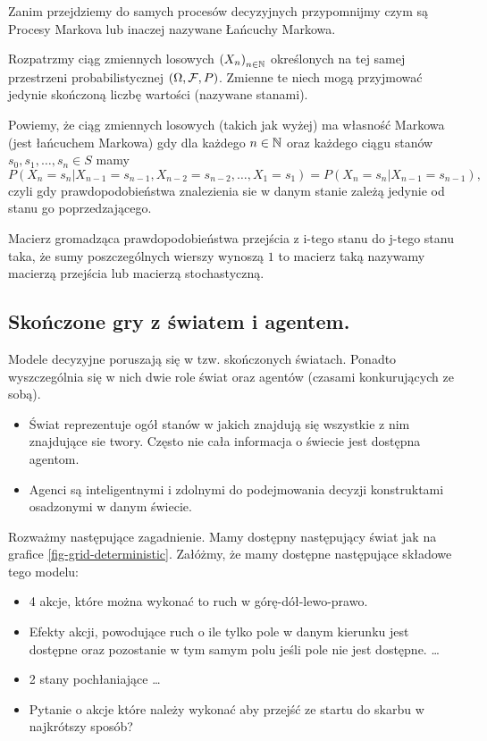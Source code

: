 \documentclass[10pt,a4paper]{book}
\begin{document}
Zanim przejdziemy do samych procesów decyzyjnych przypomnijmy czym są Procesy Markova lub inaczej nazywane Łańcuchy Markowa. 

Rozpatrzmy ciąg zmiennych losowych $\left( {X_n} \right)_{n\in \mathbb{N} }^{}$ określonych na tej samej przestrzeni probabilistycznej $(\Omega, \mathcal{F},P)$. Zmienne te niech mogą przyjmować jedynie skończoną liczbę wartości (nazywane stanami).

\begin{definition}
Powiemy, że ciąg zmiennych losowych (takich jak wyżej) ma własność Markowa (jest łańcuchem Markowa) gdy dla każdego $n \in \mathbb{N}$ oraz każdego ciągu stanów $s_0, s_1, \ldots, s_n \in S$ mamy
$$
P(X_n = s_n | X_{n-1} = s_{n-1}, X_{n-2} = s_{n-2}, \ldots, X_1 = s_1) = 
P(X_n = s_n | X_{n-1} = s_{n-1}),
$$ 
czyli gdy prawdopodobieństwa znalezienia sie w danym stanie zależą jedynie od stanu go poprzedzającego.
\end{definition}

\begin{definition}
Macierz gromadząca prawdopodobieństwa przejścia z i-tego stanu do j-tego stanu taka, że sumy poszczególnych wierszy wynoszą $1$ to macierz taką nazywamy macierzą przejścia lub macierzą stochastyczną.
\end{definition}

\subsection{Skończone gry z światem i agentem.}

Modele decyzyjne poruszają się w tzw. skończonych światach. Ponadto wyszczególnia się w nich dwie role świat oraz agentów (czasami konkurujących ze sobą). 
\begin{itemize}
\item Świat reprezentuje ogół stanów w jakich znajdują się wszystkie z nim znajdujące sie twory. Często nie cała informacja o świecie jest dostępna agentom.
\item Agenci są inteligentnymi i zdolnymi do podejmowania decyzji konstruktami osadzonymi w danym świecie. 
\end{itemize}  

\begin{problem*}
Rozważmy następujące zagadnienie. Mamy dostępny następujący świat jak na grafice \ref{fig-grid-deterministic}. Załóżmy, że mamy dostępne następujące składowe tego modelu:
\begin{itemize}
\item 4 akcje, które można wykonać to ruch w górę-dół-lewo-prawo.
\item Efekty akcji, powodujące ruch o ile tylko pole w danym kierunku jest dostępne oraz pozostanie w tym samym polu jeśli pole nie jest dostępne. \ldots
\item 2 stany pochłaniające \ldots
\item Pytanie o akcje które należy wykonać aby przejść ze startu do skarbu w najkrótszy sposób?
\end{itemize}
\end{problem*}
\end{document}
